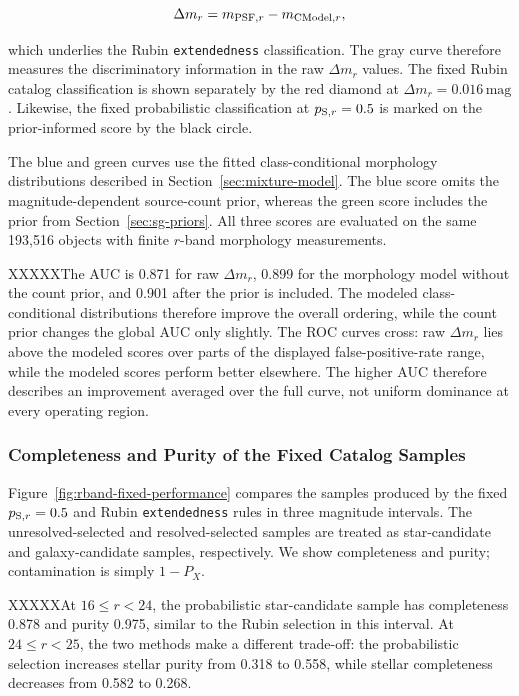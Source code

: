 \begin{equation}
    \Delta m_r=m_{{\rm PSF},r}-m_{{\rm CModel},r},
    \label{eq:delta-m-r}
\end{equation}

which underlies the Rubin \texttt{extendedness} classification.  The gray
curve therefore measures the discriminatory information in the raw
$\Delta m_r$ values.  The fixed Rubin catalog classification is shown
separately by the red diamond at $\Delta m_r=0.016\,\mathrm{mag}$.  Likewise,
the fixed probabilistic classification at $p_{{\rm S},r}=0.5$ is marked on the
prior-informed score by the black circle.

The blue and green curves use the fitted class-conditional morphology
distributions described in Section~\ref{sec:mixture-model}.  The blue score
omits the magnitude-dependent source-count prior, whereas the green score
includes the prior from Section~\ref{sec:sg-priors}.  All three scores are
evaluated on the same 193,516 objects with finite $r$-band morphology
measurements.

XXXXXThe AUC is 0.871 for raw $\Delta m_r$, 0.899 for the morphology model without
the count prior, and 0.901 after the prior is included.  The modeled
class-conditional distributions therefore improve the overall ordering, while
the count prior changes the global AUC only slightly.  The ROC curves cross:
raw $\Delta m_r$ lies above the modeled scores over parts of the displayed
false-positive-rate range, while the modeled scores perform better elsewhere.
The higher AUC therefore describes an improvement averaged over the full
curve, not uniform dominance at every operating region.

\subsubsection{Completeness and Purity of the Fixed Catalog Samples}
\label{sec:rband-catalog-performance}

Figure~\ref{fig:rband-fixed-performance} compares the samples produced by the
fixed $p_{{\rm S},r}=0.5$ and Rubin \texttt{extendedness} rules in three
magnitude intervals.  The unresolved-selected and resolved-selected samples
are treated as star-candidate and galaxy-candidate samples, respectively.  We
show completeness and purity; contamination is simply $1-P_X$.

XXXXXAt $16\leq r<24$, the probabilistic star-candidate sample has completeness
0.878 and purity 0.975, similar to the Rubin selection in this interval.  At
$24\leq r<25$, the two methods make a different trade-off: the probabilistic
selection increases stellar purity from 0.318 to 0.558, while stellar
completeness decreases from 0.582 to 0.268.


